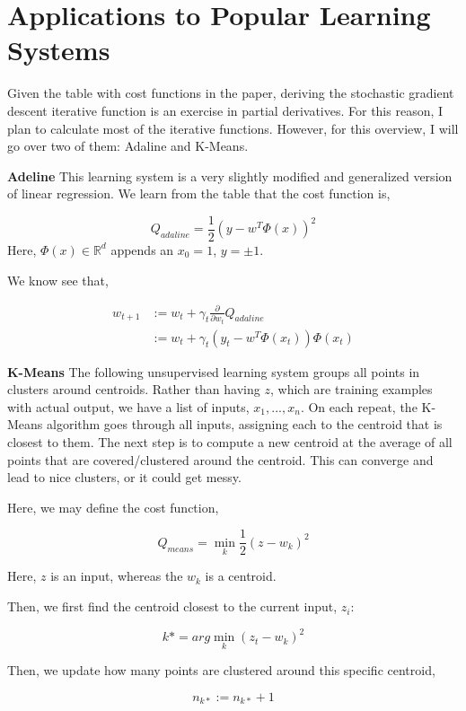 \documentclass[twoside]{article}
\theoremstyle{definition}
\theoremstyle{definition}
\theoremstyle{remark}
\begin{document}
\section{Applications to Popular Learning Systems}

Given the table with cost functions in the paper, deriving the stochastic gradient descent iterative function is an exercise in partial derivatives. For this reason, I plan to calculate most of the iterative functions. However, for this overview, I will go over two of them: Adaline and K-Means.

\textbf{Adeline} This learning system is a very slightly modified and generalized version of linear regression. We learn from the table that the cost function is,

$$ Q_{adaline} = \frac{1}{2} (y - w^T \Phi (x))^2 $$
Here, $\Phi(x) \in \mathbb{R}^{d}$ appends an $x_0 = 1$, $y = \pm 1$.

We know see that,

\begin{equation} 
\begin{split}
 w_{t+1} & := w_t + \gamma_t \frac{\partial }{\partial w_t} Q_{adaline} \\
 & :=  w_t + \gamma_t (y_t - w^T \Phi (x_t)) \Phi (x_t)
\end{split}
\end{equation}

\textbf{K-Means} The following unsupervised learning system groups all points in clusters around centroids. Rather than having $z$, which are training examples with actual output, we have a list of inputs, $x_1, ..., x_n$. On each repeat, the K-Means algorithm goes through all inputs, assigning each to the centroid that is closest to them. The next step is to compute a new centroid at the average of all points that are covered/clustered around the centroid. This can converge and lead to nice clusters, or it could get messy.

Here, we may define the cost function, 

$$ Q_{means} = \min_k \frac{1}{2} (z - w_k)^2 $$

Here, $z$ is an input, whereas the $w_k$ is a centroid.

Then, we first find the centroid closest to the current input, $z_i$:

$$k* = arg \min_k (z_t - w_k)^2$$

Then, we update how many points are clustered around this specific centroid,

$$n_{k*} := n_{k*} +1$$
\end{document}
